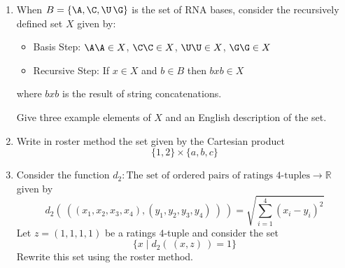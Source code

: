 

\begin{enumerate}

    \item When $B = \{ \A, \C, \U\, \G\}$ is the set of RNA bases, 
    consider the recursively defined set $X$ given by:
    \begin{itemize}
    \item[] Basis Step: $\A\A \in X$, $\C\C \in X$, $\U\U \in X$, $\G\G \in X$
    \item[] Recursive Step: If $x \in X$ and $b \in B$ then $bxb \in X$
    \end{itemize}
    where $bxb$ is the result of string concatenations.

    Give three example elements of $X$ and an English description of the set.

    \item Write in roster method the set given by the Cartesian product
    \[ 
        \{1,2\} \times \{a,b,c\}
    \]

    \item Consider the function $d_2: \textrm{The set of ordered pairs of ratings $4$-tuples} \to \mathbb{R}$
    given by 
    \[ 
        d_2 (~( (x_1, x_2, x_3, x_4), (y_1, y_2, y_3, y_4)~)~) = \sqrt{\sum_{i=1}^4 (x_i - y_i)^2}
    \]
    Let $z = (1,1,1,1)$ be a ratings $4$-tuple and consider the set
    \[
        \{ x \mid d_2 ( ~(x,z)~) = 1 \}
    \]
    Rewrite this set using the roster method.
\end{enumerate}
